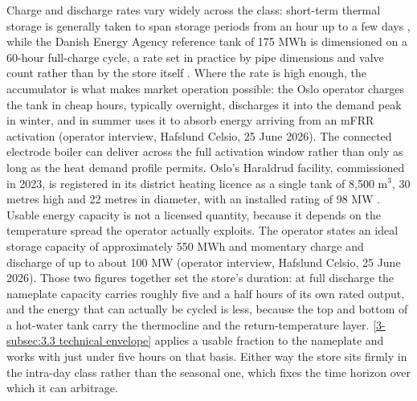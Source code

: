 Charge and discharge rates vary widely across the class: short-term thermal storage is generally taken to span storage periods from an hour up to a few days \cite{hennessy_flexibility_2019}, while the Danish Energy Agency reference tank of 175 MWh is dimensioned on a $60$-hour full-charge cycle, a rate set in practice by pipe dimensions and valve count rather than by the store itself \cite{danish_energy_agency_energy_2025}. Where the rate is high enough, the accumulator is what makes market operation possible: the Oslo operator charges the tank in cheap hours, typically overnight, discharges it into the demand peak in winter, and in summer uses it to absorb energy arriving from an mFRR activation (operator interview, Hafslund Celsio, 25 June 2026). The connected electrode boiler can deliver across the full activation window rather than only as long as the heat demand profile permits. Oslo's Haraldrud facility, commissioned in 2023, is registered in its district heating licence as a single tank of 8,500 m$^3$, 30 metres high and 22 metres in diameter, with an installed rating of 98 MW \cite{nve_konsesjonssak_2026}. Usable energy capacity is not a licensed quantity, because it depends on the temperature spread the operator actually exploits. The operator states an ideal storage capacity of approximately 550 MWh and momentary charge and discharge of up to about 100 MW (operator interview, Hafslund Celsio, 25 June 2026). Those two figures together set the store's duration: at full discharge the nameplate capacity carries roughly five and a half hours of its own rated output, and the energy that can actually be cycled is less, because the top and bottom of a hot-water tank carry the thermocline and the return-temperature layer. \autoref{3-subsec:3.3 technical envelope} applies a usable fraction to the nameplate and works with just under five hours on that basis. Either way the store sits firmly in the intra-day class rather than the seasonal one, which fixes the time horizon over which it can arbitrage.

